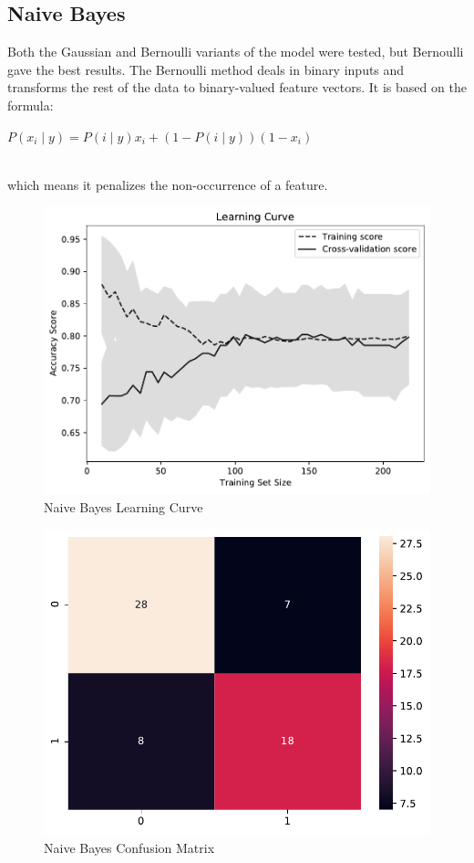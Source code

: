 \documentclass[conference]{IEEEtran}
\begin{document}
\subsection{Naive Bayes}
Both the Gaussian and Bernoulli variants of the model were tested, but Bernoulli gave the best results. The Bernoulli method deals in binary inputs and transforms the rest of the data to binary-valued feature vectors. It is based on the formula:
\\[\baselineskip]
\centerline{$P(x_i \mid y) = P(i \mid y) x_i + (1 - P(i \mid y)) (1 - x_i)$}
\\[\baselineskip]
which means it penalizes the non-occurrence of a feature.

\begin{figure}[H]
    \centerline{\includegraphics[width=0.9\linewidth]{images/BernoulliNB_lc.pdf}}
    \caption{Naive Bayes Learning Curve}
    \label{nb_lc}
\end{figure}

\noindent


\begin{figure}[H]
    \centerline{\includegraphics[width=0.8\linewidth]{images/naive_bayes_cm.pdf}}
    \caption{Naive Bayes Confusion Matrix}
    \label{nb_cm}
\end{figure}
\end{document}
